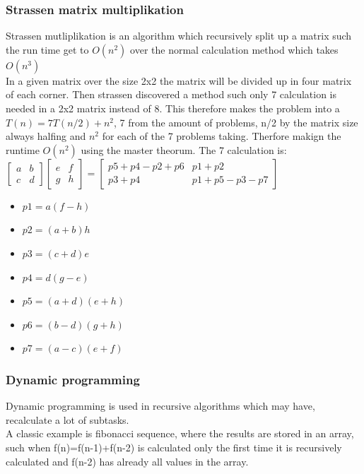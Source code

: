 \documentclass[12pt, a4paper]{article}
\begin{document}
				\subsubsection{Strassen matrix multiplikation}
					Strassen mutliplikation is an algorithm which recursively split up a matrix such the run time get to $O(n^2)$ over the normal calculation method which takes $O(n^3)$\\
					In a given matrix over the size 2x2 the matrix will be divided up in four matrix of each corner. Then strassen discovered a method such only 7 calculation is needed in a 2x2 matrix instead of 8. This therefore makes the problem into a $T(n)=7T(n/2)+n^2$, 7 from the amount of problems, n/2 by the matrix size always halfing and $n^2$ for each  of the 7 problems taking. Therfore makign the runtime $O(n^2)$ using the master theorum.
					The 7 calculation is:
					$\begin{bmatrix}a&b\\ c&d\end{bmatrix}\begin{bmatrix}e&f\\ g&h\end{bmatrix}=\begin{bmatrix}p5+p4-p2+p6&p1+p2\\ p3+p4&p1+p5-p3-p7\end{bmatrix}$
					\begin{itemize}
						\item $p1=a(f-h)$
						\item $p2=(a+b)h$
						\item $p3=(c+d)e$
						\item $p4=d(g-e)$
						\item $p5=(a+d)(e+h)$
						\item $p6=(b-d)(g+h)$
						\item $p7=(a-c)(e+f)$
					\end{itemize}
				\subsubsection{Dynamic programming}
					Dynamic programming is used in recursive algorithms which may have, recalculate a lot of subtasks.\\
					A classic example is fibonacci sequence, where the results are stored in an array, such when f(n)=f(n-1)+f(n-2) is calculated only the first time it is recursively calculated and f(n-2) has already all values in the array.
\end{document}
